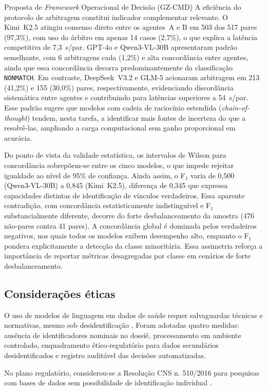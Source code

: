 \begin{chapter}{Proposta de \textit{Framework} Operacional de Decisão (GZ-CMD)}
A eficiência do protocolo de arbitragem constitui indicador complementar relevante. O Kimi~K2.5 atingiu consenso direto entre os agentes~A e B em 503 dos 517 pares (97,3\%), com uso do árbitro em apenas 14 casos (2,7\%), o que explica a latência competitiva de 7,3~s/par. GPT-4o e Qwen3-VL-30B apresentaram padrão semelhante, com 6 arbitragens cada (1,2\%) e alta concordância entre agentes, ainda que essa concordância decorra predominantemente da classificação \texttt{NONMATCH}. Em contraste, DeepSeek~V3.2 e GLM-5 acionaram arbitragem em 213 (41,2\%) e 155 (30,0\%) pares, respectivamente, evidenciando discordância sistemática entre agentes e contribuindo para latências superiores a 54~s/par. Esse padrão sugere que modelos com cadeia de raciocínio estendida (\textit{chain-of-thought}) tendem, nesta tarefa, a identificar mais fontes de incerteza do que a resolvê-las, ampliando a carga computacional sem ganho proporcional em acurácia.

Do ponto de vista da validade estatística, os intervalos de Wilson para concordância sobrepõem-se entre os cinco modelos, o que impede rejeitar igualdade ao nível de 95\% de confiança. Ainda assim, o F$_1$ varia de 0,500 (Qwen3-VL-30B) a 0,845 (Kimi~K2.5), diferença de 0,345 que expressa capacidades distintas de identificação de vínculos verdadeiros. Essa aparente contradição, com concordância estatisticamente indistinguível e F$_1$ substancialmente diferente, decorre do forte desbalanceamento da amostra (476 não-pares contra 41 pares). A concordância global é dominada pelos verdadeiros negativos, nos quais todos os modelos exibem desempenho alto, enquanto o F$_1$ pondera explicitamente a detecção da classe minoritária. Essa assimetria reforça a importância de reportar métricas desagregadas por classe em cenários de forte desbalanceamento.

\subsection{Considerações éticas}
\label{sec:cap8-etica}

O uso de modelos de linguagem em dados de saúde requer salvaguardas técnicas e normativas, mesmo sob desidentificação \cite{Vayena2018}. Foram adotadas quatro medidas: ausência de identificadores nominais no dossiê, processamento em ambiente controlado, enquadramento ético-regulatório para dados secundários desidentificados e registro auditável das decisões automatizadas.

No plano regulatório, considerou-se a Resolução CNS n. 510/2016 para pesquisas com bases de dados sem possibilidade de identificação individual \cite{BrasilCNS2016}.


\end{chapter}
